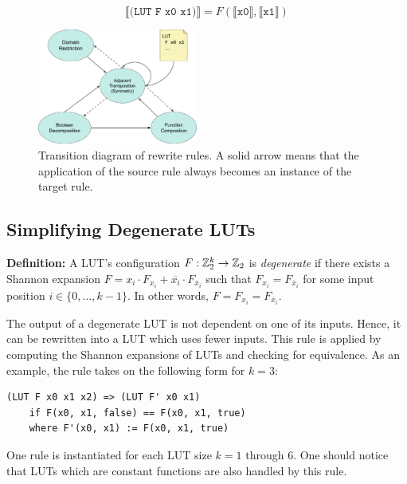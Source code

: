 \begin{equation}
    \llbracket \texttt{(LUT F x0 x1)} \rrbracket = F(\llbracket \texttt{x0} \rrbracket, \llbracket \texttt{x1} \rrbracket)
\end{equation}

\begin{figure}
    \centering
    \includegraphics[width=0.47\textwidth]{img/rewrites.pdf}
    \caption{Transition diagram of rewrite rules. A solid arrow means that the application of the source rule always becomes an instance of the target rule.}\label{fig:rewrites}
\end{figure}

\subsection{Simplifying Degenerate LUTs}\label{sec:rewrites:degen}

\textbf{Definition:} A LUT's configuration $F : \mathbb{Z}_{2}^{k} \rightarrow \mathbb{Z}_{2}$ is \textit{degenerate} if there exists a Shannon expansion $F = x_i \cdot F_{x_i} + \overline{x_i} \cdot F_{\overline{x}_i}$
such that $F_{x_i} = F_{\overline{x}_i}$ for some input position $i \in \{ 0, \ldots, k -1\}$. In other words, $F = F_{x_i} = F_{\overline{x}_i}$.

The output of a degenerate LUT is not dependent on one of its inputs. Hence, it
can be rewritten into a LUT which uses fewer inputs. This rule is applied by
computing the Shannon expansions of LUTs and checking for equivalence. As an
example, the rule takes on the following form for $k=3$:

\begin{lstlisting}
(LUT F x0 x1 x2) => (LUT F' x0 x1)
    if F(x0, x1, false) == F(x0, x1, true)
    where F'(x0, x1) := F(x0, x1, true)
\end{lstlisting}

One rule is instantiated for each LUT size $k =1$ through 6. One should notice
that LUTs which are constant functions are also handled by this rule.


